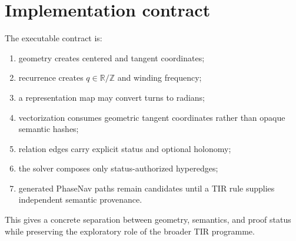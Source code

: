 \section{Implementation contract}
The executable contract is:
\begin{enumerate}
\item geometry creates centered and tangent coordinates;
\item recurrence creates $q\in\mathbb R/\mathbb Z$ and winding frequency;
\item a representation map may convert turns to radians;
\item vectorization consumes geometric tangent coordinates rather than opaque semantic hashes;
\item relation edges carry explicit status and optional holonomy;
\item the solver composes only status-authorized hyperedges;
\item generated PhaseNav paths remain candidates until a TIR rule supplies independent semantic provenance.
\end{enumerate}
This gives a concrete separation between geometry, semantics, and proof status while preserving the exploratory role of the broader TIR programme.
